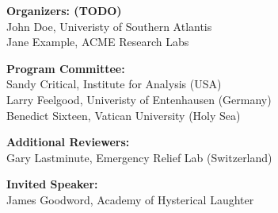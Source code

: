 \documentclass[11pt]{article}
\begin{document}

\vspace*{0.5cm}


\begin{description}
\item{\bf Organizers: (TODO)}\vspace{2mm} \\
John Doe, Univeristy of Southern Atlantis\\
Jane Example, ACME Research Labs

\vspace{3mm}
\item{\bf Program Committee:}\vspace{2mm} \\
Sandy Critical, Institute for Analysis (USA)\\
Larry Feelgood, Univeristy of Entenhausen (Germany)\\
Benedict Sixteen, Vatican University (Holy Sea)

\vspace{3mm}
\item{\bf Additional Reviewers:} \vspace{2mm} \\
Gary Lastminute, Emergency Relief Lab (Switzerland)

\vspace{3mm}
\item{\bf Invited Speaker:}\vspace{2mm} \\
James Goodword, Academy of Hysterical Laughter



\end{description}
\end{document}

